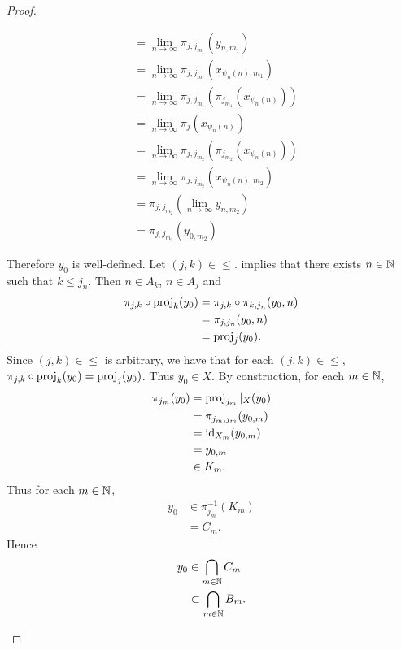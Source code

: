 \documentclass{book}
\begin{document}
\begin{proof}
\begin{enumerate}
\begin{enumerate}
\begin{itemize}
\begin{align*}
					& = \lim\limits_{n \rightarrow \infty} \pi_{j, j_{m_1}}( y_{n,m_1}) \\
					& = \lim\limits_{n \rightarrow \infty} \pi_{j, j_{m_1}}(x_{\psi_n(n),m_1}) \\
					& = \lim\limits_{n \rightarrow \infty} \pi_{j, j_{m_1}}(\pi_{j_{m_1}}(x_{\psi_n(n)})) \\
					& = \lim\limits_{n \rightarrow \infty} \pi_j(x_{\psi_n(n)}) \\
					& = \lim\limits_{n \rightarrow \infty} \pi_{j, j_{m_2}}(\pi_{j_{m_2}}(x_{\psi_n(n)})) \\
					& = \lim\limits_{n \rightarrow \infty} \pi_{j, j_{m_2}}(x_{\psi_n(n),m_2}) \\
					& = \pi_{j, j_{m_2}}(\lim\limits_{n \rightarrow \infty} y_{n,m_2}) \\
					& = \pi_{j,j_{m_2}}(y_{0,m_2})
				\end{align*}
			\end{itemize}
			Therefore $y_0$ is well-defined. Let $(j,k) \in {\leq}$.  implies that there exists $n \in \mathbb{N}$ such that $k \leq j_n$. Then $n \in A_k$, $n \in A_j$ and 
			\begin{align*}
				\pi_{j,k} \circ \operatorname{\text{proj}}_k(y_0)
				& = \pi_{j,k} \circ  \pi_{k, j_n}(y_0,n) \\
				& = \pi_{j, j_n}(y_0, n) \\
				& = \operatorname{\text{proj}}_j(y_0).
			\end{align*}
			Since $(j,k) \in {\leq}$ is arbitrary, we have that for each $(j,k) \in {\leq}$, $\pi_{j,k} \circ \operatorname{\text{proj}}_k(y_0) = \operatorname{\text{proj}}_j(y_0)$. Thus $y_0 \in X$. By construction, for each $m \in \mathbb{N}$, 
			\begin{align*}
				\pi_{j_m}(y_0)
				& = \operatorname{\text{proj}}_{j_m}|_{X}(y_0) \\
				& = \pi_{j_m, j_m}(y_{0,m}) \\
				& = \operatorname{id}_{X_m}(y_{0,m}) \\
				& = y_{0,m} \\
				& \in K_m.
			\end{align*}
			Thus for each $m \in \mathbb{N}$, 
			\begin{align*}
				y_0 
				& \in \pi_{j_m}^{-1}(K_m) \\
				& = C_m.
			\end{align*}
			Hence 
			\begin{align*}
				y_0
				& \in \bigcap\limits_{m \in \mathbb{N}} C_m \\
				& \subset  \bigcap\limits_{m \in \mathbb{N}} B_m.
			\end{align*}

\end{enumerate}
\end{enumerate}
\end{proof}
\end{document}
